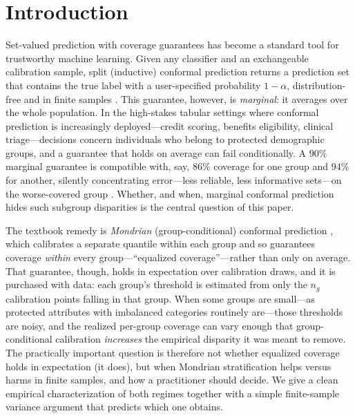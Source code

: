 \documentclass[review,12pt]{elsarticle}
\begin{document}
\linenumbers

\section{Introduction}
\label{sec:intro}

Set-valued prediction with coverage guarantees has become a standard tool for trustworthy machine learning. Given any classifier and an exchangeable calibration sample, split (inductive) conformal prediction returns a prediction set that contains the true label with a user-specified probability $1-\alpha$, distribution-free and in finite samples \cite{vovk2005,papadopoulos2002,angelopoulos2023}. This guarantee, however, is \emph{marginal}: it averages over the whole population. In the high-stakes tabular settings where conformal prediction is increasingly deployed---credit scoring, benefits eligibility, clinical triage---decisions concern individuals who belong to protected demographic groups, and a guarantee that holds on average can fail conditionally. A $90\%$ marginal guarantee is compatible with, say, $86\%$ coverage for one group and $94\%$ for another, silently concentrating error---less reliable, less informative sets---on the worse-covered group \cite{romano2020eq}. Whether, and when, marginal conformal prediction hides such subgroup disparities is the central question of this paper.

The textbook remedy is \emph{Mondrian} (group-conditional) conformal prediction \cite{vovk2003,romano2020eq}, which calibrates a separate quantile within each group and so guarantees coverage \emph{within} every group---``equalized coverage''---rather than only on average. That guarantee, though, holds in expectation over calibration draws, and it is purchased with data: each group's threshold is estimated from only the $n_g$ calibration points falling in that group. When some groups are small---as protected attributes with imbalanced categories routinely are---those thresholds are noisy, and the realized per-group coverage can vary enough that group-conditional calibration \emph{increases} the empirical disparity it was meant to remove. The practically important question is therefore not whether equalized coverage holds in expectation (it does), but when Mondrian stratification helps versus harms in finite samples, and how a practitioner should decide. We give a clean empirical characterization of both regimes together with a simple finite-sample variance argument that predicts which one obtains.
\end{document}
